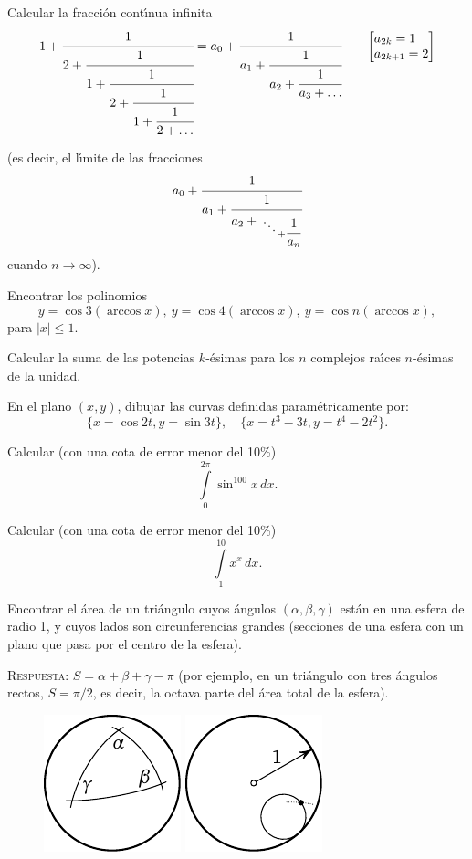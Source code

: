 \documentclass[12pt, spanish]{article}  %
\begin{document}
\newpage
{} Calcular la fracci\'on cont\'{\i}nua infinita
\begin{align*}
1+\cfrac{1}{2+\cfrac{1}{1+\cfrac{1}{2+\cfrac{1}{1+\cfrac{1}{2+\ldots}}}}}=
a_0+\cfrac{1}{a_1+\cfrac{1}{a_2+\cfrac{1}{a_3+\dots}}} \qquad
\smash{
{\left[\begin{aligned} &a_{2k}=1 \\[-\jot] &a_{2k+1}
      =2 \end{aligned}\right]} }
\end{align*}

\medskip

\noindent (es decir, el l\'{\i}mite de las fracciones
$$
a_0+\cfrac{1}{a_1+\cfrac{1}{a_2+{\atop{\ddots \atop {}} + \cfrac{1}{a_n}}
} 
}
$$
cuando $n \to \infty$).


\bigskip
{} Encontrar los polinomios
\[
y=\cos 3 (\arccos x),\  y=\cos 4 (\arccos x),\ 
y=\cos n (\arccos x),
\] 
para $|x| \leqslant 1$. 


\bigskip
{} Calcular la suma de las potencias $k$-\'esimas para los $n$ complejos ra\'{\i}ces $n$-\'esimas de la unidad.  
 

\bigskip
{} En el plano $(x,y)$, dibujar las curvas definidas param\'etricamente por: 
\[
\{x=\cos 2t, y=\sin 3t\},\quad 
\{x=t^3-3t, y=t^4-2t^2\}.
\]

\bigskip
{} Calcular (con una cota de error menor del 10\%)
$$
\int\limits_0^{2\pi} \sin^{100} x\,dx.
$$

\bigskip
{} Calcular (con una cota de error menor del 10\%)
$$
\int\limits_1^{10} x^x\,dx.
$$

\bigskip
{} Encontrar el \'area de un tri\'angulo cuyos \'angulos $(\alpha, \beta, \gamma)$ est\'an en una esfera de radio 1,
y cuyos lados son circunferencias grandes (secciones de una esfera con un plano que pasa por el centro de la esfera).

\medskip
\textsc{Respuesta:} $S=\alpha+\beta+\gamma-\pi$ (por ejemplo, en un tri\'angulo con tres \'angulos rectos, $S=\pi/2$, es decir, la octava parte del \'area total de la esfera).
\begin{figure}[h]
\centering
 \includegraphics{taskbook-44}\hskip2cm \includegraphics{taskbook-45}
\end{figure}
\end{document}
